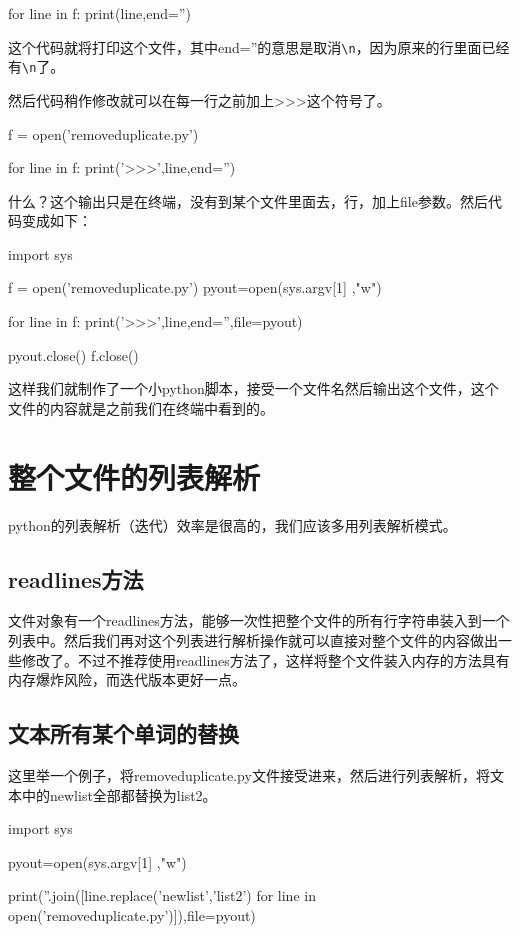 \documentclass[12pt,oneside]{book}
\begin{document}
\begin{common-format}
\begin{tcbpython}
for line in f:
    print(line,end='')
\end{tcbpython}
这个代码就将打印这个文件，其中end=''的意思是取消\verb+\n+，因为原来的行里面已经有\verb+\n+了。

然后代码稍作修改就可以在每一行之前加上>>>这个符号了。 
\begin{tcbpython}
f = open('removeduplicate.py')

for line in f:
    print('>>>',line,end='')
\end{tcbpython}

什么？这个输出只是在终端，没有到某个文件里面去，行，加上file参数。然后代码变成如下：
\begin{tcbpython}
import sys

f = open('removeduplicate.py')
pyout=open(sys.argv[1] ,"w")

for line in f:
    print('>>>',line,end='',file=pyout)

pyout.close()
f.close()
\end{tcbpython}
这样我们就制作了一个小python脚本，接受一个文件名然后输出这个文件，这个文件的内容就是之前我们在终端中看到的。

\section{整个文件的列表解析}
python的列表解析（迭代）效率是很高的，我们应该多用列表解析模式。

\subsection{readlines方法}
文件对象有一个readlines方法，能够一次性把整个文件的所有行字符串装入到一个列表中。然后我们再对这个列表进行解析操作就可以直接对整个文件的内容做出一些修改了。不过不推荐使用readlines方法了，这样将整个文件装入内存的方法具有内存爆炸风险，而迭代版本更好一点。

\subsection{文本所有某个单词的替换}
这里举一个例子，将removeduplicate.py文件接受进来，然后进行列表解析，将文本中的newlist全部都替换为list2。

\begin{tcbpython}
import sys

pyout=open(sys.argv[1] ,"w")

print(''.join([line.replace('newlist','list2') 
for line in open('removeduplicate.py')]),file=pyout)


\end{tcbpython}
\end{common-format}
\end{document}
